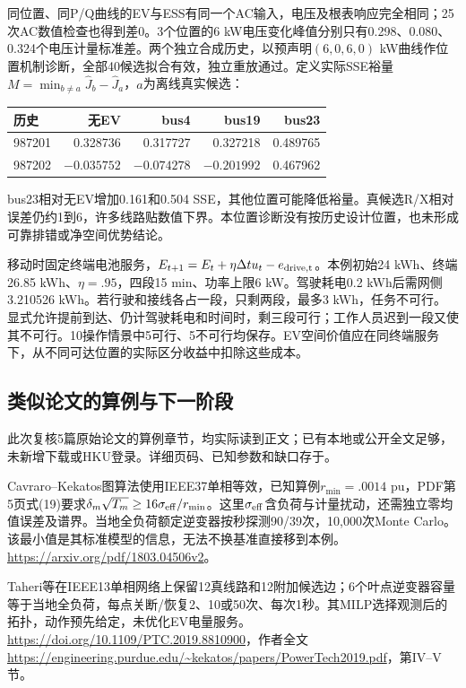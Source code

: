 \documentclass[UTF8,fontset=fandol,11pt,a4paper]{ctexart}
\begin{document}
同位置、同P/Q曲线的EV与ESS有同一个AC输入，电压及根表响应完全相同；25次AC数值检查也得到差0。3个位置的6 kW电压变化峰值分别只有0.298、0.080、0.324个电压计量标准差。两个独立合成历史，以预声明$(6,0,6,0)$ kW曲线作位置机制诊断，全部40候选拟合有效，独立重放通过。定义实际SSE裕量$M=\min_{b\ne a}\hat J_b-\hat J_a$，$a$为离线真实候选：
\begin{center}\begin{tabular}{lrrrr}
\toprule 历史 & 无EV & bus4 & bus19 & bus23\\\midrule
987201&0.328736&0.317727&0.327218&0.489765\\
987202&$-0.035752$&$-0.074278$&$-0.201992$&0.467962\\\bottomrule
\end{tabular}\end{center}
bus23相对无EV增加0.161和0.504 SSE，其他位置可能降低裕量。真候选R/X相对误差仍约1到6，许多线路贴数值下界。本位置诊断没有按历史设计位置，也未形成可靠排错或净空间优势结论。

移动时固定终端电池服务，$E_{t+1}=E_t+\eta\Delta t u_t-e_{\rm drive,t}$。本例初始24 kWh、终端26.85 kWh、$\eta=.95$，四段15 min、功率上限6 kW。驾驶耗电0.2 kWh后需网侧3.210526 kWh。若行驶和接线各占一段，只剩两段，最多3 kWh，任务不可行。显式允许提前到达、仍计驾驶耗电和时间时，剩三段可行；工作人员迟到一段又使其不可行。10操作情景中5可行、5不可行均保存。EV空间价值应在同终端服务下，从不同可达位置的实际区分收益中扣除这些成本。

\subsection{类似论文的算例与下一阶段}
此次复核5篇原始论文的算例章节，均实际读到正文；已有本地或公开全文足够，未新增下载或HKU登录。详细页码、已知参数和缺口存于。

Cavraro--Kekatos图算法使用IEEE37单相等效，已知算例$r_{\min}=.0014$ pu，PDF第5页式(19)要求$\delta_m\sqrt{T_m}\ge16\sigma_{\rm eff}/r_{\min}$。这里$\sigma_{\rm eff}$含负荷与计量扰动，还需独立零均值误差及谱界。当地全负荷额定逆变器按秒探测90/39次，10,000次Monte Carlo。该最小值是其标准模型的信息，无法不换基准直接移到本例。\url{https://arxiv.org/pdf/1803.04506v2}。

Taheri等在IEEE13单相网络上保留12真线路和12附加候选边；6个叶点逆变器容量等于当地全负荷，每点关断/恢复2、10或50次、每次1秒。其MILP选择观测后的拓扑，动作预先给定，未优化EV电量服务。\url{https://doi.org/10.1109/PTC.2019.8810900}，作者全文\url{https://engineering.purdue.edu/~kekatos/papers/PowerTech2019.pdf}，第IV--V节。
\end{document}
